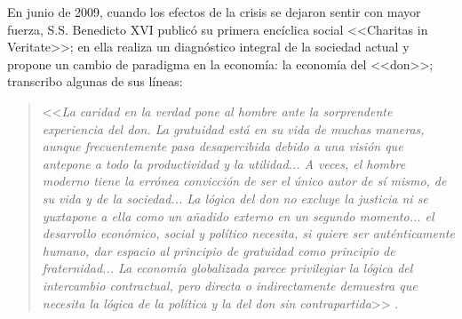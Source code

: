 En junio de 2009, cuando los efectos de la crisis se dejaron sentir con mayor fuerza, S.S. Benedicto XVI publicó su primera encíclica social <<Charitas in Veritate>>; en ella realiza un diagnóstico integral de la sociedad actual y propone un cambio de paradigma en la economía: la economía del <<don>>; transcribo algunas de sus líneas:

\begin{quote}
<<\textit{La caridad en la verdad pone al hombre ante la sorprendente experiencia del don. La gratuidad está en su vida de muchas maneras, aunque frecuentemente pasa desapercibida debido a una visión que antepone a todo la productividad y la utilidad... A veces, el hombre moderno tiene la errónea convicción de ser el único autor de sí mismo, de su vida y de la sociedad... La lógica del don no excluye la justicia ni se yuxtapone a ella como un añadido externo en un segundo momento... el desarrollo económico, social y político necesita, si quiere ser auténticamente humano, dar espacio al principio de gratuidad como principio de fraternidad... La economía globalizada parece privilegiar la lógica del intercambio contractual, pero directa o indirectamente demuestra que necesita la lógica de la política y la del don sin contrapartida}>> \citep{BenedictoXVI2009}.
\end{quote}
